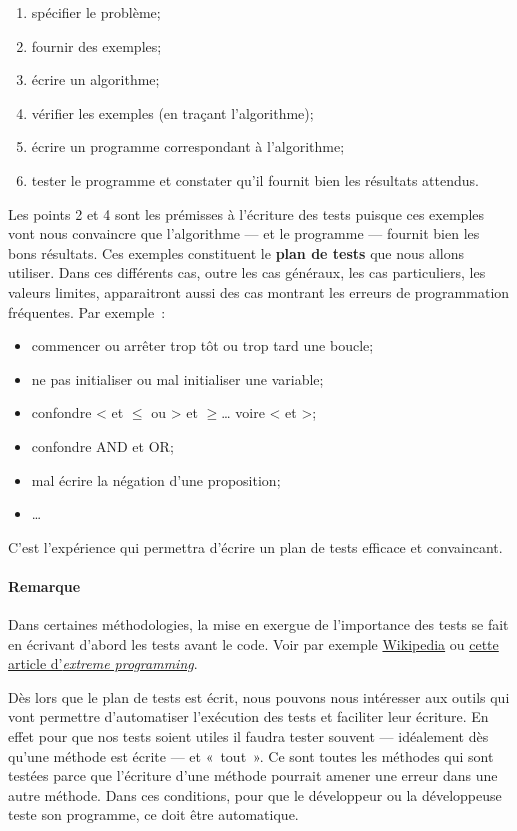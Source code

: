 \begin{enumerate}
	\item spécifier le problème;
	\item fournir des exemples;
	\item écrire un algorithme;
	\item vérifier les exemples (en traçant l'algorithme);
	\item écrire un programme correspondant à l'algorithme;
	\item tester le programme et constater qu'il fournit bien les résultats attendus.
\end{enumerate}

Les points 2 et 4 sont les prémisses à l'écriture des tests puisque ces exemples
vont nous convaincre que l'algorithme --- et le programme --- fournit bien les
\og{}bons\fg{} résultats. Ces exemples constituent le \textbf{plan de tests} que nous allons utiliser. Dans ces différents cas, outre les cas généraux, les cas particuliers, les valeurs limites, apparaitront aussi des cas montrant les erreurs de programmation fréquentes. Par exemple~:

\begin{itemize}
	\item commencer ou arrêter trop tôt ou trop tard une boucle;
	\item ne pas initialiser ou mal initialiser une variable;
	\item confondre < et $\le$ ou > et $\ge$… voire < et >;
	\item confondre AND et OR;
	\item mal écrire la négation d'une proposition;
	\item \dots
\end{itemize}

C'est l'expérience qui permettra d'écrire un plan de tests efficace et
convaincant.

\paragraph{Remarque} Dans certaines méthodologies, la mise en exergue de l'importance des tests se fait en écrivant d'abord les tests avant le code.
Voir par exemple \href{https://fr.wikipedia.org/wiki/Test_driven_development}{Wikipedia} ou \href{http://www.extremeprogramming.org/rules/testfirst.html}{cette article d'\textit{extreme programming}}. 

Dès lors que le plan de tests est écrit, nous pouvons nous intéresser aux outils
qui vont permettre d'automatiser l'exécution des tests et faciliter leur
écriture.  En effet pour que nos tests soient utiles il faudra tester souvent
— idéalement dès qu'une méthode est écrite — et «~tout~». Ce sont toutes les
méthodes qui sont testées parce que l'écriture d'une méthode pourrait amener une
erreur dans une autre méthode. Dans ces conditions, pour que le développeur ou
la développeuse teste son programme, ce doit être automatique.  

